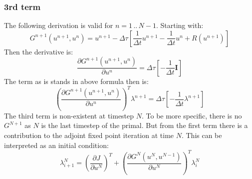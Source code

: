 \documentclass[10pt]{article}
\begin{document}
\subsubsection*{3rd term}
The following derivation is valid for $n = 1\,..\,N-1$. Starting with:
\begin{equation}
G^{n+1}\left( u^{n+1},u^{n} \right) = u^{n+1} - \Delta\tau\left[ \frac{1}{\Delta t} u^{n+1} - \frac{1}{\Delta t} u^{n} + R \left( u^{n+1} \right) \right]
\end{equation}
Then the derivative is:
\begin{equation}
\frac{\partial G^{n+1}\left( u^{n+1},u^{n} \right)}{\partial u^n} =  \Delta\tau\left[ -\frac{1}{\Delta t} \mathbf{I} \right]
\end{equation}
The term as is stands in above formula then is:
\begin{equation}
\left( \frac{\partial G^{n+1}\left( u^{n+1},u^{n} \right)}{\partial u^n} \right)^T \lambda^{n+1} =   \Delta\tau\left[ -\frac{1}{\Delta t} \lambda^{n+1} \right]
\end{equation}
The third term is non-existent at timestep $N$. To be more specific, there is no $G^{N+1}$ as $N$ is the last timestep of the primal. But from the first term there is a contribution to the adjoint fixed point iteration at time $N$. This can be interpreted as an initial condition:
\begin{equation}
\lambda^{N}_{i+1} = \left( \frac{\partial J}{\partial u^N} \right)^T + \left( \frac{\partial G^N\left( u^N,u^{N-1} \right)}{\partial u^N}  \right)^T \lambda^N_i  
\end{equation}
\end{document}
